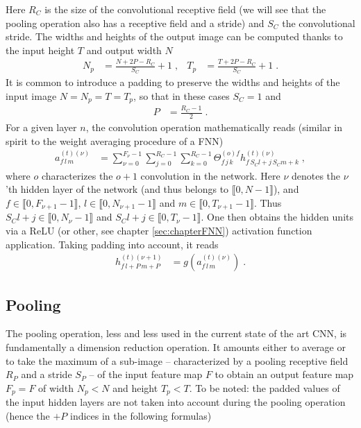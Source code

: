 Here $R_C$ is the size of the convolutional receptive field (we will see that the pooling operation also has a receptive field and a stride) and $S_C$ the convolutional stride. The widths and heights of the output image can be computed thanks to the input height $T$ and output width $N$
\begin{align}
N_p&=\frac{N+2P-R_C}{S_C}+1 \;,&
%
T_p&=\frac{T+2P-R_C}{S_C}+1\;.
\end{align}
It is common to introduce a padding to preserve the widths and heights of the input image $N=N_p=T=T_p$, so that in these cases $S_C=1$ and
\begin{align}
P&=\frac{R_C-1}{2}\;.
\end{align}
For a given layer $n$, the convolution operation mathematically reads (similar in spirit to the weight averaging procedure of a FNN)
\begin{align}
a_{f\,l\,m}^{(t)(\nu)}&=\sum^{F_\nu-1}_{\nu=0}\sum^{R_C-1}_{j=0}\sum^{R_C-1}_{k=0}
%
\Theta^{(o)f}_{f\,j\,k}h^{(t)(\nu)}_{f\,S_Cl+j\,S_Cm+k}\;,
\end{align}
where $o$ characterizes the $o+1$ convolution in the network. Here $\nu$ denotes the $\nu$'th hidden layer of the network (and thus belongs to $\llbracket0,N-1 \rrbracket$), and $f\in\llbracket0,F_{\nu+1}-1\rrbracket$, $l\in\llbracket0,N_{\nu+1}-1 \rrbracket$ and $m\in\llbracket0,T_{\nu+1}-1 \rrbracket$. Thus $S_Cl+j\in\llbracket0,N_\nu-1 \rrbracket$ and $S_Cl+j\in\llbracket0,T_\nu-1 \rrbracket$. One then obtains the hidden units via a ReLU (or other, see chapter \ref{sec:chapterFNN}) activation function application. Taking padding into account, it reads
\begin{align}
h_{f\,l+P\,m+P}^{(t)(\nu+1)}&=g\left(a_{f\,l\,m}^{(t)(\nu)}\right)\;.
\end{align} 


\subsection{Pooling}

The pooling operation, less and less used in the current state of the art CNN, is fundamentally a dimension reduction operation. It amounts either to average or to take the maximum of a sub-image -- characterized by a pooling receptive field $R_P$ and a stride $S_P$ -- of the input feature map $F$ to obtain an output feature map $F_p=F$ of width $N_p<N$ and height $T_p<T$. To be noted: the padded values of the input hidden layers are not taken into account during the pooling operation (hence the $+P$ indices in the following formulas)



